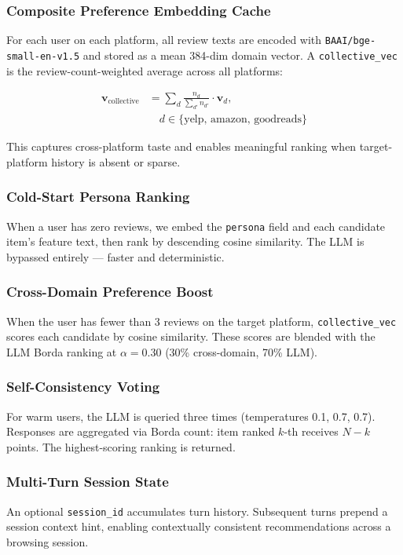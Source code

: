 \documentclass[11pt]{article}
\begin{document}
\subsubsection{Composite Preference Embedding Cache}
For each user on each platform, all review texts are encoded with \texttt{BAAI/bge-small-en-v1.5} and stored as a mean 384-dim domain vector. A \texttt{collective\_vec} is the review-count-weighted average across all platforms:

\begin{equation}
\begin{aligned}
\mathbf{v}_\text{collective}
&=
\sum_{d}
\frac{n_d}{\sum_{d'} n_{d'}}
\cdot \mathbf{v}_d, \\
&\quad d \in \{\text{yelp, amazon, goodreads}\}
\end{aligned}
\label{eq:collective}
\end{equation}

This captures cross-platform taste and enables meaningful ranking when target-platform history is absent or sparse.

\subsubsection{Cold-Start Persona Ranking}
When a user has zero reviews, we embed the \texttt{persona} field and each candidate item's feature text, then rank by descending cosine similarity. The LLM is bypassed entirely --- faster and deterministic.

\subsubsection{Cross-Domain Preference Boost}
When the user has fewer than 3 reviews on the target platform, \texttt{collective\_vec} scores each candidate by cosine similarity. These scores are blended with the LLM Borda ranking at $\alpha = 0.30$ (30\% cross-domain, 70\% LLM).

\subsubsection{Self-Consistency Voting}
For warm users, the LLM is queried three times (temperatures 0.1, 0.7, 0.7). Responses are aggregated via Borda count: item ranked $k$-th receives $N - k$ points. The highest-scoring ranking is returned.

\subsubsection{Multi-Turn Session State}
An optional \texttt{session\_id} accumulates turn history. Subsequent turns prepend a session context hint, enabling contextually consistent recommendations across a browsing session.
\end{document}
